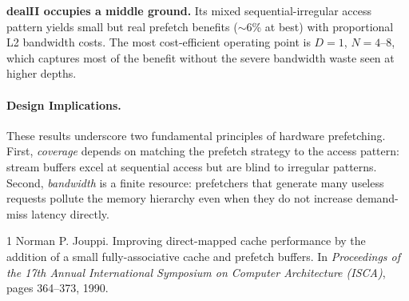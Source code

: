 \documentclass[11pt,letterpaper]{article}
\begin{document}
\textbf{dealII occupies a middle ground.} Its mixed sequential-irregular access
pattern yields small but real prefetch benefits ($\sim$6\% at best) with
proportional L2 bandwidth costs. The most cost-efficient operating point is
$D=1$, $N=4$--8, which captures most of the benefit without the severe
bandwidth waste seen at higher depths.

\paragraph{Design Implications.}
These results underscore two fundamental principles of hardware prefetching.
First, \emph{coverage} depends on matching the prefetch strategy to the access
pattern: stream buffers excel at sequential access but are blind to irregular
patterns. Second, \emph{bandwidth} is a finite resource: prefetchers that
generate many useless requests pollute the memory hierarchy even when they do
not increase demand-miss latency directly.


\begin{thebibliography}{1}
Norman P. Jouppi.
\newblock Improving direct-mapped cache performance by the addition of a small
fully-associative cache and prefetch buffers.
\newblock In \emph{Proceedings of the 17th Annual International Symposium on
Computer Architecture (ISCA)}, pages 364--373, 1990.
\end{thebibliography}
\end{document}

